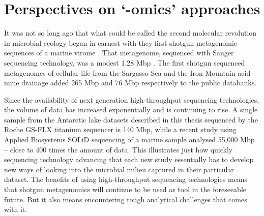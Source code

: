 \section{Perspectives on `-omics' approaches }
It was not so long ago that what could be called the second molecular revolution in microbial ecology began in earnest with they first shotgun metagenomic sequences of a marine virome \cite{Breitbart2002}.
That metagenome, sequenced with Sanger sequencing technology, was a modest 1.28 Mbp \cite{Breitbart2002}.
The first shotgun sequenced metagenomes of cellular life from the Sargasso Sea \cite{Venter2004} and the Iron Mountain acid mine drainage \cite{Tyson2004} added 265 Mbp and 76 Mbp respectively to the public databanks.

Since the availability of next generation high-throughput sequencing technologies, the volume of data has increased exponentially and is continuing to rise.
A single sample from the Antarctic lake datasets described in this thesis sequenced by the Roche GS-FLX titanium sequencer is 140 Mbp, while a recent study using Applied Biosystems SOLiD sequencing of a marine sample \cite{Iverson2012} analysed 55,000 Mbp -- close to 400 times the amount of data.
This illustrates just how quickly sequencing technology advancing that each new study essentially has to develop new ways of looking into the microbial milieu captured in their particular dataset.
The benefits of using high-throughput sequencing technologies means that shotgun metagenomics will continue to be used as tool in the foreseeable future.
But it also means encountering tough analytical challenges that comes with it.

